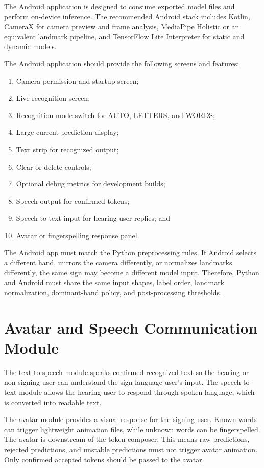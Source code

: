 The Android application is designed to consume exported model files and perform on-device inference. The recommended Android stack includes Kotlin, CameraX for camera preview and frame analysis, MediaPipe Holistic or an equivalent landmark pipeline, and TensorFlow Lite Interpreter for static and dynamic models.

The Android application should provide the following screens and features:

\begin{enumerate}
    \item Camera permission and startup screen;
    \item Live recognition screen;
    \item Recognition mode switch for AUTO, LETTERS, and WORDS;
    \item Large current prediction display;
    \item Text strip for recognized output;
    \item Clear or delete controls;
    \item Optional debug metrics for development builds;
    \item Speech output for confirmed tokens;
    \item Speech-to-text input for hearing-user replies; and
    \item Avatar or fingerspelling response panel.
\end{enumerate}

The Android app must match the Python preprocessing rules. If Android selects a different hand, mirrors the camera differently, or normalizes landmarks differently, the same sign may become a different model input. Therefore, Python and Android must share the same input shapes, label order, landmark normalization, dominant-hand policy, and post-processing thresholds.

\section{Avatar and Speech Communication Module}

The text-to-speech module speaks confirmed recognized text so the hearing or non-signing user can understand the sign language user's input. The speech-to-text module allows the hearing user to respond through spoken language, which is converted into readable text.

The avatar module provides a visual response for the signing user. Known words can trigger lightweight animation files, while unknown words can be fingerspelled. The avatar is downstream of the token composer. This means raw predictions, rejected predictions, and unstable predictions must not trigger avatar animation. Only confirmed accepted tokens should be passed to the avatar.

